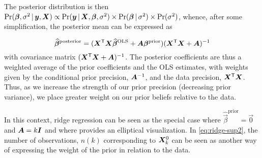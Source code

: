The posterior distribution is then
$\Pr (\bm{\beta}, \sigma^2 \, | \, \bm{y}, \bm{X}) \propto \Pr (\bm{y} \, | \, \bm{X}, \bm{\beta}, \sigma^2) \times
\Pr (\bm{\beta} \, | \, \sigma^2) \times \Pr (\sigma^2)$,
whence, after some simplification,
the posterior mean can be expressed as

\begin{equation}\label{eq:bayes-posterior}
\widehat{\bm{\beta}}^{\mathrm{posterior}} =
(\bm{X}^\mathsf{T} \bm{X}\widehat{\bm{\beta}}^{\mathrm{OLS}} + \bm{A} \bm{\beta}^{\mathrm{prior}})
(\bm{X}^\mathsf{T} \bm{X}+\bm{A})^{-1}
\end{equation}
with covariance matrix $(\bm{X}^\mathsf{T} \bm{X}+\bm{A})^{-1}$. The posterior coefficients are thus a weighted average of
the prior coefficients and the OLS estimates, with weights given by the conditional prior precision, $\bm{A}^{-1}$,
and the data precision, $\bm{X}^\mathsf{T}\bm{X}$.  Thus, as we increase the strength of our prior precision (decreasing
prior variance), we place greater weight on our prior beliefs relative to the data.

In this context, ridge regression can be seen as the special case where $\widehat{\vec{\beta}}^{\mathrm{prior}} = \vec{0}$ and $\bm{A} = k \bm{I}$
and where  provides an elliptical visualization. In \eqref{eq:ridge-sup2}, the number of observations,
$n(k)$ corresponding to $\bm{X}_k^0$ can be seen as another way of expressing the weight of the prior in relation to the data.




